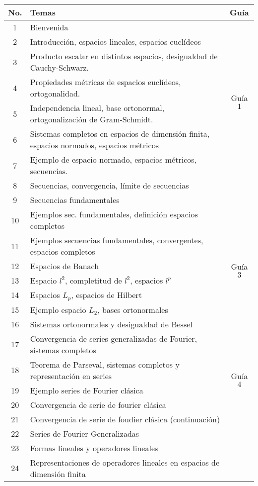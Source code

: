 \vspace{1cm}


\begin{table}[H]
	\centering
	\begin{tabular}{||c|p{13cm}||c||}
		\hline
		\hline
			No. & Temas & Guía \\
		\hline
		\hline
			1  & Bienvenida &  \\
		\hline
			2  & Introducción, espacios lineales, espacios euclídeos &  \\
			3  & Producto escalar en distintos espacios, desigualdad de Cauchy-Schwarz. & \multirow{4}{2cm}{Guía $1$} \\
			4  & Propiedades métricas de espacios euclídeos, ortogonalidad.  &  \\
			5  & Independencia lineal, base ortonormal,  ortogonalización de Gram-Schmidt. &  \\
		\hline
			6  & Sistemas completos en espacios de dimensión finita, espacios normados, espacios métricos & \multirow{4}{2cm}{Guía $2$} \\
			7  & Ejemplo de espacio normado, espacios métricos, secuencias. &  \\
			8  & Secuencias, convergencia, límite de secuencias &  \\
			9  & Secuencias fundamentales &  \\
		\hline
			10 & Ejemplos sec. fundamentales, definición espacios completos & \multirow{7}{2cm}{Guía $3$} \\
			11 & Ejemplos secuencias fundamentales, convergentes, espacios completos &  \\
			12 & Espacios de Banach &  \\
			13 & Espacio $l^2$, completitud de $l^2$, espacios $l^p$ &  \\
			14 & Espacios $L_p$, espacios de Hilbert &  \\
			15 & Ejemplo espacio $L_2$, bases ortonormales &  \\
			16 & Sistemas ortonormales y desigualdad de Bessel &  \\
		\hline
			17 & Convergencia de series generalizadas de Fourier, sistemas completos & \multirow{5}{2cm}{Guía $4$} \\
			18 & Teorema de Parseval, sistemas completos y representación en series & \\
			19 & Ejemplo series de Fourier clásica & \\
			20 & Convergencia de serie de fourier clásica & \\
			21 & Convergencia de serie de foudier clásica (continuación) & \\
		\hline
			22 & Series de Fourier Generalizadas & \\
			23 & Formas lineales y operadores lineales & \\
			24 & Representaciones de operadores lineales en espacios de dimensión finita & \\
		\hline
		\hline
	\end{tabular}
\end{table}









